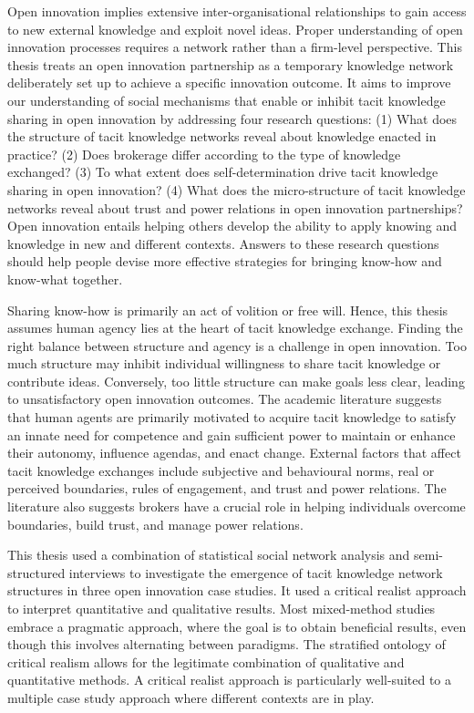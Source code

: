 \documentclass[12pt,table,xcdraw]{book}
\begin{document}
Open innovation implies extensive inter-organisational relationships to gain access to new external knowledge and exploit novel ideas. Proper understanding of open innovation processes requires a network rather than a firm-level perspective. This thesis treats an open innovation partnership as a temporary knowledge network deliberately set up to achieve a specific innovation outcome. It aims to improve our understanding of social mechanisms that enable or inhibit tacit knowledge sharing in open innovation by addressing four research questions: (1) What does the structure of tacit knowledge networks reveal about knowledge enacted in practice? (2) Does brokerage differ according to the type of knowledge exchanged? (3) To what extent does self-determination drive tacit knowledge sharing in open innovation? (4) What does the micro-structure of tacit knowledge networks reveal about trust and power relations in open innovation partnerships? Open innovation entails helping others develop the ability to apply knowing and knowledge in new and different contexts. Answers to these research questions should help people devise more effective strategies for bringing know-how and know-what together. \medskip

Sharing know-how is primarily an act of volition or free will. Hence, this thesis assumes human agency lies at the heart of tacit knowledge exchange. Finding the right balance between structure and agency is a challenge in open innovation. Too much structure may inhibit individual willingness to share tacit knowledge or contribute ideas. Conversely, too little structure can make goals less clear, leading to unsatisfactory open innovation outcomes. The academic literature suggests that human agents are primarily motivated to acquire tacit knowledge to satisfy an innate need for competence and gain sufficient power to maintain or enhance their autonomy, influence agendas, and enact change. External factors that affect tacit knowledge exchanges include subjective and behavioural norms, real or perceived boundaries, rules of engagement, and trust and power relations. The literature also suggests brokers have a crucial role in helping individuals overcome boundaries, build trust, and manage power relations. \medskip

This thesis used a combination of statistical social network analysis and semi-structured interviews to investigate the emergence of tacit knowledge network structures in three open innovation case studies. It used a critical realist approach to interpret quantitative and qualitative results. Most mixed-method studies embrace a pragmatic approach, where the goal is to obtain beneficial results, even though this involves alternating between paradigms. The stratified ontology of critical realism allows for the legitimate combination of qualitative and quantitative methods. A critical realist approach is particularly well-suited to a multiple case study approach where different contexts are in play. \medskip
\end{document}
